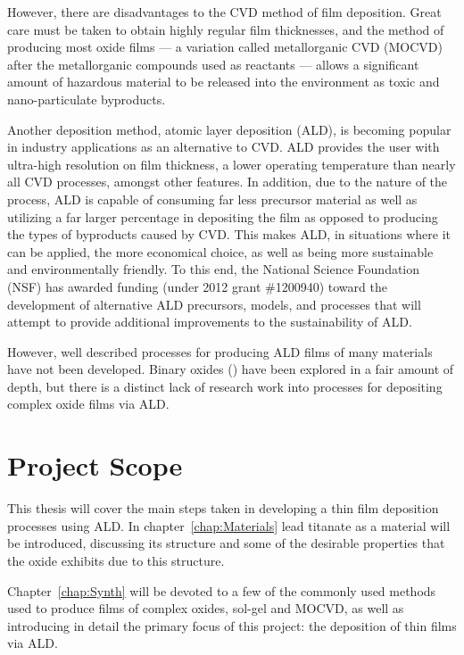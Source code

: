 However, there are disadvantages to the CVD method of film deposition. Great care must be taken to obtain highly regular film thicknesses, and the method of producing most oxide films --- a variation called metallorganic CVD (MOCVD) after the metallorganic compounds used as reactants --- allows a significant amount of hazardous material to be released into the environment as toxic and nano-particulate byproducts. 

Another deposition method, atomic layer deposition (ALD), is becoming popular in industry applications as an alternative to CVD. ALD provides the user with ultra-high resolution on film thickness, a lower operating temperature than nearly all CVD processes, amongst other features. In addition, due to the nature of the process, ALD is capable of consuming far less precursor material as well as utilizing a far larger percentage in depositing the film as opposed to producing the types of byproducts caused by CVD. This makes ALD, in situations where it can be applied, the more economical choice, as well as being more sustainable and environmentally friendly. To this end, the National Science Foundation (NSF) has awarded funding (under 2012 grant \#1200940) toward the development of alternative ALD precursors, models, and processes that will attempt to provide additional improvements to the sustainability of ALD.

However, well described processes for producing ALD films of many materials have not been developed. Binary oxides () have been explored in a fair amount of depth, but there is a distinct lack of research work into processes for depositing complex oxide films via ALD. 


\section{Project Scope}
\label{sec:Intro-Scope}

This thesis will cover the main steps taken in developing a thin film deposition processes using ALD. In chapter~\ref{chap:Materials} lead titanate as a material will be introduced, discussing its structure and some of the desirable properties that the oxide exhibits due to this structure. 

Chapter~\ref{chap:Synth} will be devoted to a few of the commonly used methods used to produce films of complex oxides, sol-gel and MOCVD, as well as introducing in detail the primary focus of this project: the deposition of thin films via ALD. 

